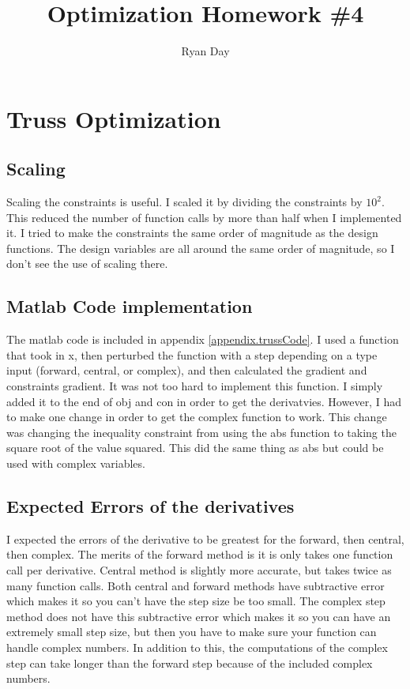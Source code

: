 \documentclass[a4paper]{article}
\author{Ryan Day}
\title{Optimization Homework \#4}
\begin{document}
    \maketitle
    \section{Truss Optimization}

    \subsection{Scaling}
    Scaling the constraints is useful. I scaled it by dividing the constraints by $10^{2}$. This reduced the number of function calls by more than half when I implemented it. 
    I tried to make the constraints the same order of magnitude as the design functions.
    The design variables are all around the same order of magnitude, so I don't see the use of scaling there.
    
    \subsection{Matlab Code implementation}
    The matlab code is included in appendix \ref{appendix.trussCode}.
    I used a function that took in x, then perturbed the function with a step depending on a type input (forward, central, or complex), and then calculated the gradient and constraints gradient.
    It was not too hard to implement this function. 
    I simply added it to the end of obj and con in order to get the derivatvies.
    However, I had to make one change in order to get the complex function to work.
    This change was changing the inequality constraint from using the abs function to taking the square root of the value squared.
    This did the same thing as abs but could be used with complex variables.
    
    \subsection{Expected Errors of the derivatives}
    I expected the errors of the derivative to be greatest for the forward, then central, then complex. 
    The merits of the forward method is it is only takes one function call per derivative. 
    Central method is slightly more accurate, but takes twice as many function calls.
    Both central and forward methods have subtractive error which makes it so you can't have the step size be too small.
    The complex step method does not have this subtractive error which makes it so you can have an extremely small step size, but then you have to make sure your function can handle complex numbers.
    In addition to this, the computations of the complex step can take longer than the forward step because of the included complex numbers.
    
\end{document}
